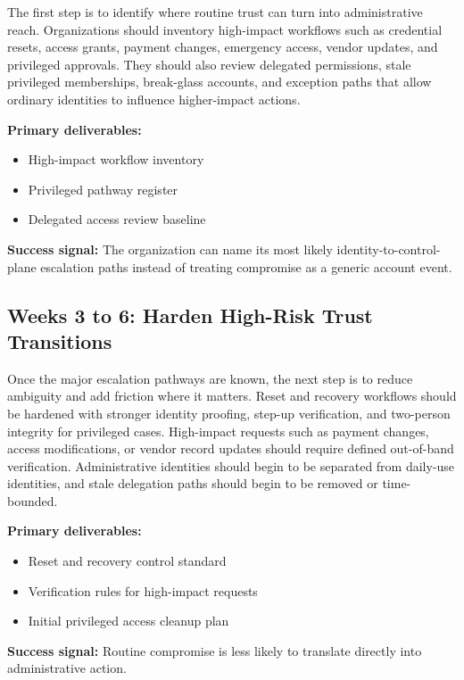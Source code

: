 \documentclass[11pt]{article}
\begin{document}
The first step is to identify where routine trust can turn into administrative reach. Organizations should inventory high-impact workflows such as credential resets, access grants, payment changes, emergency access, vendor updates, and privileged approvals. They should also review delegated permissions, stale privileged memberships, break-glass accounts, and exception paths that allow ordinary identities to influence higher-impact actions.

\textbf{Primary deliverables:}
\begin{itemize}[leftmargin=1.5em]
    \item High-impact workflow inventory
    \item Privileged pathway register
    \item Delegated access review baseline
\end{itemize}

\textbf{Success signal:}
The organization can name its most likely identity-to-control-plane escalation paths instead of treating compromise as a generic account event.

\subsection{Weeks 3 to 6: Harden High-Risk Trust Transitions}

Once the major escalation pathways are known, the next step is to reduce ambiguity and add friction where it matters. Reset and recovery workflows should be hardened with stronger identity proofing, step-up verification, and two-person integrity for privileged cases. High-impact requests such as payment changes, access modifications, or vendor record updates should require defined out-of-band verification. Administrative identities should begin to be separated from daily-use identities, and stale delegation paths should begin to be removed or time-bounded.

\textbf{Primary deliverables:}
\begin{itemize}[leftmargin=1.5em]
    \item Reset and recovery control standard
    \item Verification rules for high-impact requests
    \item Initial privileged access cleanup plan
\end{itemize}

\textbf{Success signal:}
Routine compromise is less likely to translate directly into administrative action.
\end{document}
